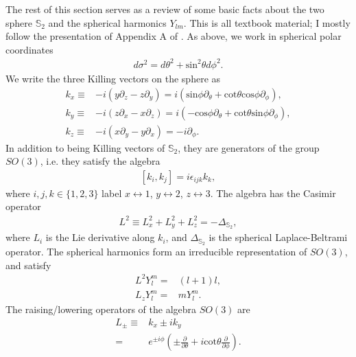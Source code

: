 \documentclass[%
 prd,
amsmath,amssymb,
preprint,%
]{revtex4-1}
\begin{document}
The rest of this section serves as a review of some basic facts about
the two sphere $\mathbb{S}_2$ and the spherical harmonics $Y_{lm}$.
This is all textbook material;
I mostly follow the presentation of Appendix A of \cite{Baumann:2019eav}.
As above, we work in spherical polar coordinates
\begin{align}
   d\sigma^2
   =
   d\theta^2
   +
   \mathrm{sin}^2\theta d\phi^2
   .
\end{align}
We write the three Killing vectors on the sphere as
\begin{subequations}
\begin{align}
   k_x
   \equiv&
   - 
   i\left(y\partial_z-z\partial_y\right)
   =
   i\left(
      \mathrm{sin}\phi\partial_{\theta}
      +
      \mathrm{cot}\theta\mathrm{cos}\phi\partial_{\phi}
   \right)
   ,\\
   k_y
   \equiv&
   -
   i\left(z\partial_x-x\partial_z\right)
   =
   i\left(
      -
      \mathrm{cos}\phi\partial_{\theta}
      +
      \mathrm{cot}\theta\mathrm{sin}\phi\partial_{\phi}
   \right)
   ,\\
   k_z
   \equiv&
   -
   i\left(x\partial_y-y\partial_x\right)
   =
   -
   i\partial_{\phi}
   .
\end{align}
\end{subequations}
In addition to being Killing vectors of $\mathbb{S}_2$, they are generators
of the group $SO(3)$, i.e. they satisfy the algebra
\begin{align}
   \left[k_i,k_j\right]
   =
   i\epsilon_{ijk}k_k
   ,
\end{align}
where $i,j,k\in\{1,2,3\}$ label
$x\leftrightarrow1$,
$y\leftrightarrow2$,
$z\leftrightarrow3$.
The algebra has the Casimir operator
\begin{align}
   L^2
   \equiv 
   L_x^2+L_y^2+L_z^2
   =
   -
   \Delta_{\mathbb{S}_2}
   ,
\end{align}
where $L_i$ is the Lie derivative along $k_i$, and
$\Delta_{\mathbb{S}_2}$ is the spherical Laplace-Beltrami operator.
The spherical harmonics form an irreducible representation of $SO(3)$,
and satisfy
\begin{subequations}
\begin{align}
   L^2Y^m_l
   =&
   \left(l+1\right)l
   ,\\
   L_zY^m_l
   =&
   mY^m_l
   .
\end{align}
\end{subequations}
The raising/lowering operators of the algebra $SO(3)$ are
\begin{align}
   L_{\pm}
   \equiv&
   k_x
   \pm
   i k_y
   \nonumber\\
   =&
   e^{\pm i\phi}
   \left(
      \pm
      \frac{\partial}{\partial\theta}
      +
      i\mathrm{cot}\theta
      \frac{\partial}{\partial\phi}
   \right)
   .
\end{align}
\end{document}
